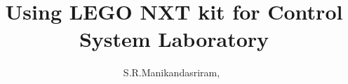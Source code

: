 \documentclass[a4paper,10pt]{article}
\begin{document}
%
\title{Using LEGO NXT kit for Control System Laboratory}
%
%
%

\author{S.R.Manikandasriram,~%
}

% 
%



%
%
% 




\end{document}
